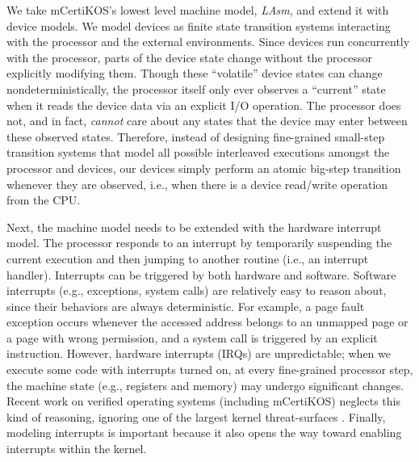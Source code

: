 We take mCertiKOS's lowest level machine model, {\it LAsm}, and extend it with
device models. We model devices as finite state transition systems interacting
with the processor and the external environments. Since devices run concurrently
with the processor, parts of the device state change without the processor
explicitly modifying them. Though these ``volatile'' device states can change
nondeterministically, the processor itself only ever observes a ``current''
state when it reads the device data via an explicit I/O operation. The processor
does not, and in fact, {\it cannot} care about any states that the device may
enter between these observed states. Therefore, instead of designing
fine-grained small-step transition systems that model all possible interleaved
executions amongst the processor and devices, our devices simply perform an
atomic big-step transition whenever they are observed, i.e., when there is a
device read/write operation from the CPU.

Next, the machine model needs to be extended with the hardware interrupt
model. The processor responds to an interrupt by temporarily
suspending the current execution and then jumping to another routine
(i.e., an interrupt handler).  Interrupts can be triggered by both
hardware and software. Software interrupts (e.g., exceptions, system
calls) are relatively easy to reason about, since their behaviors are
always deterministic. For example, a page fault exception occurs
whenever the accessed address belongs to an unmapped page or a page
with wrong permission, and a system call is triggered by an explicit
instruction. However, hardware interrupts (IRQs) are unpredictable;
when we execute some code with interrupts turned on, at every
fine-grained processor step, the machine state (e.g., registers and
memory) may undergo significant changes.  Recent work on verified
operating systems (including mCertiKOS) neglects this kind of
reasoning, ignoring one of the largest kernel threat-surfaces
\cite{dscal15,klein2009sel4,Alkassar:VSTTE2010-71}.  Finally, modeling
interrupts is important because it also opens the way toward enabling
interrupts within the kernel.


